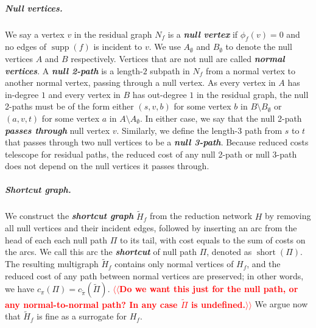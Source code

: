 \documentclass[a4paper,UKenglish]{socg-lipics-v2018}
\makeatletter
\def\note#1{\textcolor{red}{{#1}}}
\def\fsupply{\phi}
\def\short{\operatorname{short}}
\def\supp{\operatorname{supp}}
\theoremstyle{plain}
\numberwithin{figure}{section}
\renewcommand{\paragraph}{\subparagraph}
\def\EMPH#1{\textbf{\emph{\boldmath #1}}}
\def\n@te#1{\textsf{\boldmath \textbf{$\langle\!\langle$#1$\rangle\!\rangle$}}\leavevmode}
\def\note#1{\textcolor{red}{\n@te{#1}}}
\makeatother
\begin{document}
\paragraph{Null vertices.}
We say a vertex $v$ in the residual graph $N_f$ is a \EMPH{null vertex} if $\fsupply_f(v) = 0$ and no edges of $\supp(f)$ is incident to $v$.
We use $A_\emptyset$ and $B_\emptyset$ to denote the null vertices $A$ and $B$ respectively.
Vertices that are not null are called \EMPH{normal vertices}.
%
A \EMPH{null 2-path} is a length-$2$ subpath in $N_f$ from a normal vertex to another normal vertex, passing through a null vertex.
As every vertex in $A$ has in-degree $1$ and every vertex in $B$ has out-degree $1$ in the residual graph, the null 2-paths must be of the form either $(s, v, b)$ for some vertex $b$ in $B \setminus B_\emptyset$ or $(a, v, t)$ for some vertex $a$ in $A \setminus A_\emptyset$.
In either case, we say that the null 2-path \EMPH{passes through} null vertex $v$.
%
Similarly, we define the length-$3$ path from $s$ to $t$ that passes through two null
vertices to be a \EMPH{null 3-path}.
%
Because reduced costs telescope for residual paths, the reduced cost of any null 2-path or null 3-path does not depend on the null vertices it passes through.

\paragraph{Shortcut graph.}
We construct the \EMPH{shortcut graph} $\tilde{H}_f$ from the reduction network $H$ by removing all
null vertices and their incident edges, followed by inserting an arc
from the head of each each null path $\Pi$ to its tail, with cost equals to the sum of costs on the arcs.
We call this arc the \EMPH{shortcut} of null path $\Pi$, denoted as \EMPH{$\short(\Pi)$}.
%
The resulting multigraph $\tilde{H}_f$ contains only normal vertices of $H_f$, and the reduced cost of any path between normal vertices are preserved;
in other words, we have $c_\pi(\Pi) = c_{\tilde\pi}(\tilde{\Pi})$. \note{Do we want this just for the null path, or any normal-to-normal path?  In any case $\tilde{\Pi}$ is undefined.}
We argue now that $\tilde{H}_f$ is fine as a surrogate for $H_f$.
\end{document}
